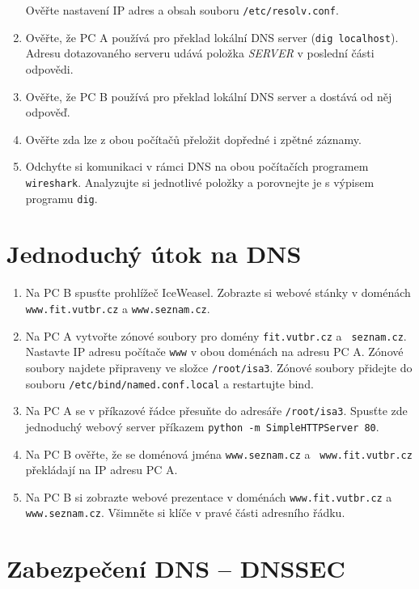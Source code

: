 \begin{enumerate}
    Ověřte nastavení IP adres a obsah souboru {\tt /etc/resolv.conf}.
  \item Ověřte, že PC A používá pro překlad lokální DNS server ({\tt dig
    localhost}). Adresu dotazovaného serveru udává položka {\em SERVER} v
    poslední části odpovědi.
  \item Ověřte, že PC B používá pro překlad lokální DNS server a dostává od něj odpověď.
  \item Ověřte zda lze z obou počítačů přeložit dopředné i zpětné záznamy.
  \item Odchyťte si komunikaci v rámci DNS na obou počítačích programem
    {\tt wireshark}. Analyzujte si jednotlivé položky a porovnejte je s výpisem
    programu {\tt dig}.

\end{enumerate}

\section{Jednoduchý útok na DNS}

\begin{enumerate}
  \item Na PC B spusťte prohlížeč IceWeasel. Zobrazte si webové stánky v
    doménách {\tt www.fit.vutbr.cz} a {\tt www.seznam.cz}.

  \item Na PC A vytvořte zónové soubory pro domény {\tt fit.vutbr.cz} a {\tt
    seznam.cz}. Nastavte IP adresu počítače {\tt www} v obou doménách na adresu
    PC A. Zónové soubory najdete připraveny ve složce {\tt /root/isa3}. Zónové
    soubory přidejte do souboru {\tt /etc/bind/named.conf.local} a restartujte
    bind.

  \item Na PC A se v příkazové řádce přesuňte do adresáře {\tt /root/isa3}.
    Spusťte zde jednoduchý webový server příkazem {\tt python -m
    SimpleHTTPServer 80}.

  \item Na PC B ověřte, že se doménová jména {\tt www.seznam.cz} a {\tt
    www.fit.vutbr.cz} překládají na IP adresu PC A.

  \item Na PC B si zobrazte webové prezentace v doménách {\tt www.fit.vutbr.cz}
    a {\tt www.seznam.cz}. Všimněte si klíče v pravé části adresního řádku.

\end{enumerate}

\section{Zabezpečení DNS -- DNSSEC}

